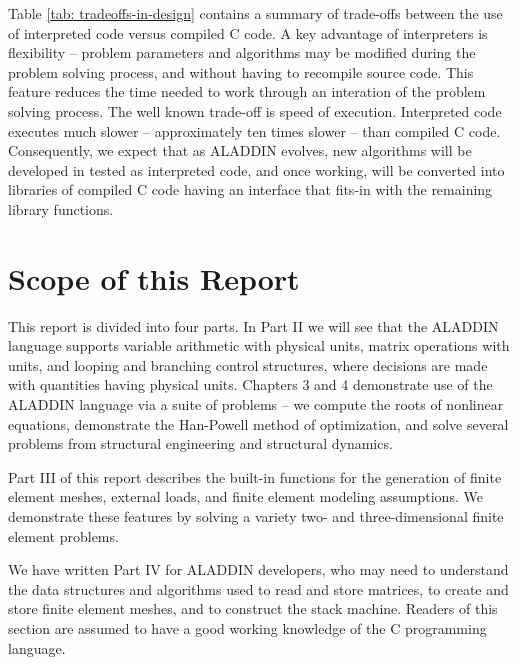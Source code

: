 \vspace{0.15 in}\noindent
Table \ref{tab: tradeoffs-in-design} contains a summary of trade-offs
between the use of interpreted code versus compiled C code.
A key advantage of interpreters is flexibility -- problem parameters and
algorithms may be modified during the problem solving process,
and without having to recompile source code.
This feature reduces the time needed to work
through an interation of the problem solving process.
The well known trade-off is speed of execution.
Interpreted code executes much slower -- approximately ten times slower --
than compiled C code.
Consequently, we expect that as ALADDIN evolves, new algorithms
will be developed in tested as interpreted code,
and once working, will be converted into libraries of compiled C code having
an interface that fits-in with the remaining library functions.


\section{Scope of this Report}

\vspace{0.15 in}
\noindent\hspace{0.50 in}
This report is divided into four parts.
In Part II we will see that the ALADDIN language supports
variable arithmetic with physical units, matrix operations with units,
and looping and branching control structures,
where decisions are made with quantities having physical units.
Chapters 3 and 4 demonstrate use of the ALADDIN language via
a suite of problems -- we compute the roots of nonlinear equations,
demonstrate the Han-Powell method of optimization,
and solve several problems from structural
engineering and structural dynamics. 

\vspace{0.15 in}
\noindent\hspace{0.50 in}
Part III of this report describes the built-in functions for the
generation of finite element meshes, external loads,
and finite element modeling assumptions. We demonstrate these
features by solving a variety two- and three-dimensional finite element problems.

\vspace{0.15 in}
\noindent\hspace{0.50 in}
We have written Part IV for ALADDIN developers,
who may need to understand the data structures and algorithms
used to read and store matrices, to create and store finite element meshes,
and to construct the stack machine.
Readers of this section are assumed to have a
good working knowledge of the C programming language.
